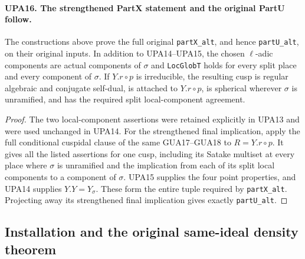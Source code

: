 \paragraph{UPA16. The strengthened PartX statement and the original PartU follow.}
\label{claim:UPA16}
The constructions above prove the full original
\texttt{partX\_alt}, and hence \texttt{partU\_alt}, on
their original inputs.
In addition to UPA14--UPA15, the chosen $\ell$-adic components
are actual components of $\sigma$ and
\texttt{LocGlobT} holds for every split place and every
component of $\sigma$.  If $Y.r\circ p$ is irreducible,
the resulting cusp is regular algebraic and conjugate
self-dual, is attached to $Y.r\circ p$, is spherical
wherever $\sigma$ is unramified, and has the required
split local-component agreement.
\begin{proof}
The two local-component assertions were retained
explicitly in UPA13 and were used unchanged in UPA14.
For the strengthened final implication, apply the
full conditional cuspidal clause of the same
GUA17--GUA18 to $R=Y.r\circ p$.
It gives all the listed assertions for one cusp,
including its Satake multiset at every place where
$\sigma$ is unramified and the implication from each
of its split local components to a component of
$\sigma$.  UPA15 supplies the four point properties,
and UPA14 supplies $Y.Y=Y_\sigma$.  These form the
entire tuple required by \texttt{partX\_alt}.
Projecting away its strengthened final implication
gives exactly \texttt{partU\_alt}.
\end{proof}

\subsection{Installation and the original same-ideal density theorem}

